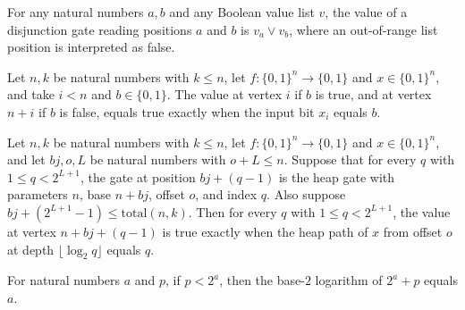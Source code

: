 \begin{theorem}
\label{BoolCircuit.Lupanov.eval_or_pair}
\leanok
{}
For any natural numbers $a,b$ and any Boolean value list $v$, the value of a disjunction
gate reading positions $a$ and $b$ is $v_a\lor v_b$, where an out-of-range list position
is interpreted as false.
\end{theorem}

\begin{theorem}
\label{BoolCircuit.Lupanov.value_litV}
\leanok
{}
Let $n,k$ be natural numbers with $k\le n$, let $f:\{0,1\}^n\to\{0,1\}$ and
$x\in\{0,1\}^n$, and take $i<n$ and $b\in\{0,1\}$. The value at vertex $i$ if $b$ is
true, and at vertex $n+i$ if $b$ is false, equals true exactly when the input bit $x_i$
equals $b$.
\end{theorem}

\begin{theorem}
\label{BoolCircuit.Lupanov.value_heap}
\leanok
{}
Let $n,k$ be natural numbers with $k\le n$, let $f:\{0,1\}^n\to\{0,1\}$ and
$x\in\{0,1\}^n$, and let $bj,o,L$ be natural numbers with $o+L\le n$. Suppose that for
every $q$ with $1\le q<2^{L+1}$, the gate at position $bj+(q-1)$ is the heap gate with
parameters $n$, base $n+bj$, offset $o$, and index $q$. Also suppose
$bj+(2^{L+1}-1)\le\mathrm{total}(n,k)$. Then for every $q$ with $1\le q<2^{L+1}$, the
value at vertex $n+bj+(q-1)$ is true exactly when the heap path of $x$ from offset $o$
at depth $\lfloor\log_2 q\rfloor$ equals $q$.
\end{theorem}

\begin{theorem}
\label{BoolCircuit.Lupanov.log_two_pow_add}
\leanok
{}
For natural numbers $a$ and $p$, if $p<2^a$, then the base-$2$ logarithm of $2^a+p$
equals $a$.
\end{theorem}

